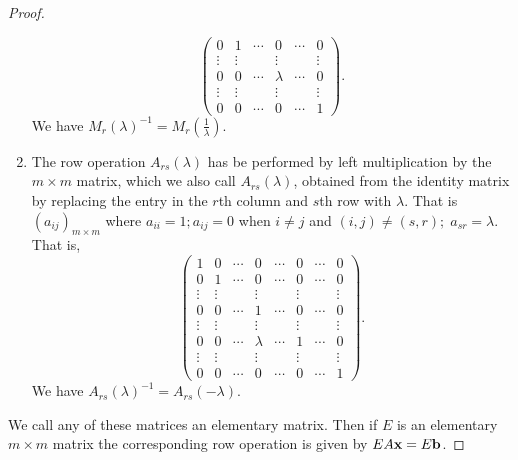 \documentclass[10pt, a4paper]{article}
\begin{document}
\begin{theorem}[continues = thm:lintoech]
\begin{proof}
\begin{enumerate}[label = (\alph*)]
\[\begin{pmatrix}
                0 & 1 & \dotsi & 0 & \dotsi & 0 \\
                \vdots & \vdots & \phantom{} & \vdots & \phantom{} & \vdots \\
                0 & 0 & \dotsi & \lambda & \dotsi & 0 \\
                \vdots & \vdots & \phantom{} & \vdots & \phantom{} & \vdots \\
                0 & 0 & \dotsi & 0 & \dotsi & 1
            \end{pmatrix}.
            \]
            We have $M_r(\lambda) ^ {-1} = M_r\left(\frac{1}{\lambda}\right)$.
            \item The row operation $A_{rs}(\lambda)$ has be performed by left multiplication by the $m \times m$ matrix,
            which we also call $A_{rs}(\lambda)$,
            obtained from the identity matrix by replacing the entry in the $r$th column and $s$th row with $\lambda$.
            That is $(a_{ij})_{m \times m}$ where $a_{ii} = 1; a_{ij} = 0$ when $i \neq j$ and $(i, j) \neq (s, r);\; a_{sr} = \lambda$.
            That is,
            \[
            \begin{pmatrix}
                1 & 0 & \dotsi & 0 & \dotsi & 0 & \dotsi & 0 \\
                0 & 1 & \dotsi & 0 & \dotsi & 0 & \dotsi & 0 \\
                \vdots & \vdots & \phantom{} & \vdots & \phantom{} & \vdots & \phantom{} & \vdots \\
                0 & 0 & \dotsi & 1 & \dotsi & 0 & \dotsi & 0 \\
                \vdots & \vdots & \phantom{} & \vdots & \phantom{} & \vdots & \phantom{} & \vdots \\
                0 & 0 & \dotsi & \lambda & \dotsi & 1 & \dotsi & 0 \\
                \vdots & \vdots & \phantom{} & \vdots & \phantom{} & \vdots & \phantom{} & \vdots \\
                0 & 0 & \dotsi & 0 & \dotsi & 0 & \dotsi & 1
            \end{pmatrix}.
            \]
            We have $A_{rs}(\lambda) ^ {-1} = A_{rs}(-\lambda)$.
        \end{enumerate}
        We call any of these matrices an elementary matrix.
        Then if $E$ is an elementary $m \times m$ matrix the corresponding row operation is given by $EA\mathbf{x} = E\mathbf{b}$.
    \end{proof}
\end{theorem}
\end{document}
